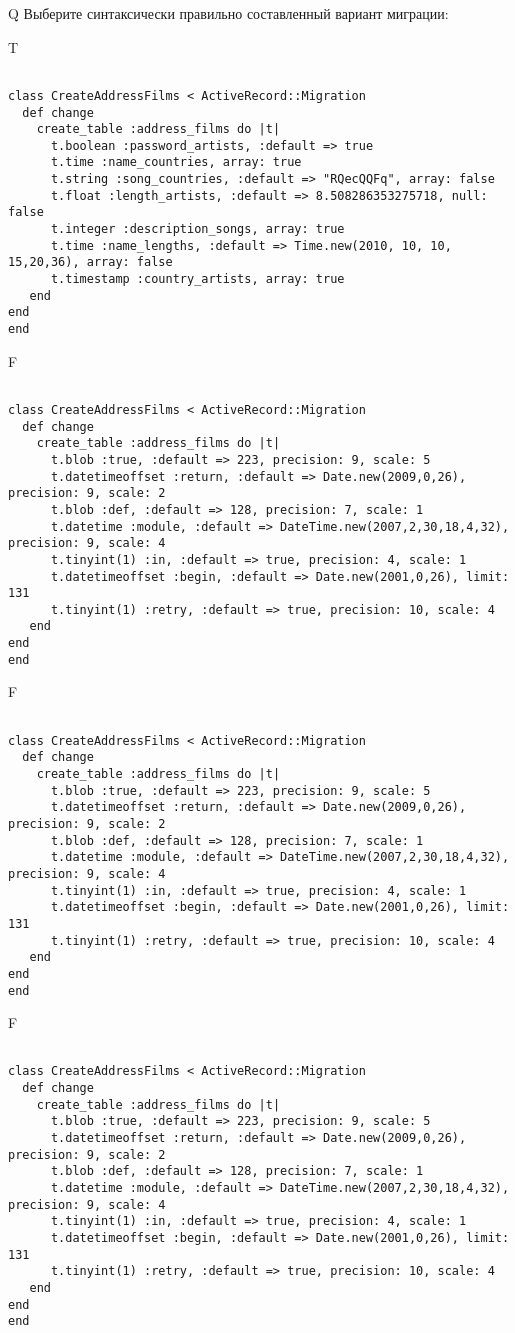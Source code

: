 Q
Выберите синтаксически правильно составленный вариант миграции:

T
\begin{verbatim}
		
class CreateAddressFilms < ActiveRecord::Migration 
  def change 
    create_table :address_films do |t| 
      t.boolean :password_artists, :default => true
      t.time :name_countries, array: true
      t.string :song_countries, :default => "RQecQQFq", array: false
      t.float :length_artists, :default => 8.508286353275718, null: false
      t.integer :description_songs, array: true
      t.time :name_lengths, :default => Time.new(2010, 10, 10, 15,20,36), array: false
      t.timestamp :country_artists, array: true
   end
end
end
\end{verbatim}

F
\begin{verbatim}
		
class CreateAddressFilms < ActiveRecord::Migration 
  def change 
    create_table :address_films do |t| 
      t.blob :true, :default => 223, precision: 9, scale: 5
      t.datetimeoffset :return, :default => Date.new(2009,0,26), precision: 9, scale: 2
      t.blob :def, :default => 128, precision: 7, scale: 1
      t.datetime :module, :default => DateTime.new(2007,2,30,18,4,32), precision: 9, scale: 4
      t.tinyint(1) :in, :default => true, precision: 4, scale: 1
      t.datetimeoffset :begin, :default => Date.new(2001,0,26), limit: 131
      t.tinyint(1) :retry, :default => true, precision: 10, scale: 4
   end
end
end
\end{verbatim}

F
\begin{verbatim}
		
class CreateAddressFilms < ActiveRecord::Migration 
  def change 
    create_table :address_films do |t| 
      t.blob :true, :default => 223, precision: 9, scale: 5
      t.datetimeoffset :return, :default => Date.new(2009,0,26), precision: 9, scale: 2
      t.blob :def, :default => 128, precision: 7, scale: 1
      t.datetime :module, :default => DateTime.new(2007,2,30,18,4,32), precision: 9, scale: 4
      t.tinyint(1) :in, :default => true, precision: 4, scale: 1
      t.datetimeoffset :begin, :default => Date.new(2001,0,26), limit: 131
      t.tinyint(1) :retry, :default => true, precision: 10, scale: 4
   end
end
end
\end{verbatim}

F
\begin{verbatim}
		
class CreateAddressFilms < ActiveRecord::Migration 
  def change 
    create_table :address_films do |t| 
      t.blob :true, :default => 223, precision: 9, scale: 5
      t.datetimeoffset :return, :default => Date.new(2009,0,26), precision: 9, scale: 2
      t.blob :def, :default => 128, precision: 7, scale: 1
      t.datetime :module, :default => DateTime.new(2007,2,30,18,4,32), precision: 9, scale: 4
      t.tinyint(1) :in, :default => true, precision: 4, scale: 1
      t.datetimeoffset :begin, :default => Date.new(2001,0,26), limit: 131
      t.tinyint(1) :retry, :default => true, precision: 10, scale: 4
   end
end
end
\end{verbatim}


